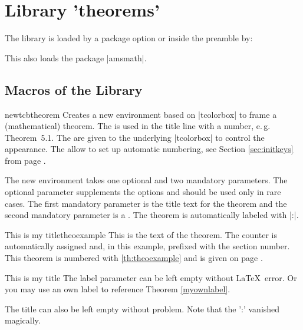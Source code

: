\clearpage
\section{Library 'theorems'}\label{sec:theorems}
The library is loaded by a package option or inside the preamble by:
\begin{dispListing}
\end{dispListing}
This also loads the package |amsmath|.

\subsection{Macros of the Library}


\begin{docCommand}{newtcbtheorem}{}
  Creates a new environment  based on |tcolorbox| to frame a
  (mathematical) theorem. The  is used in the title line
  with a number, e.\,g. \mbox{\flqq Theorem 5.1\frqq}.
  The  are given to the underlying |tcolorbox| to control
  the appearance.
  The  allow to set up automatic numbering,
  see Section \ref{sec:initkeys} from page \pageref{sec:initkeys}.\par
  The new environment  takes one optional and two mandatory
  parameters. The optional parameter supplements the options and should be
  used only in rare cases.
  The first mandatory parameter is the title text for the theorem and
  the second mandatory parameter is a . The theorem is
  automatically labeled with |:|.

\enlargethispage*{20mm}
\begin{dispExample}
\begin{mytheo}{This is my title}{theoexample}
  This is the text of the theorem. The counter is automatically assigned and,
  in this example, prefixed with the section number. This theorem is numbered with
  \ref{th:theoexample} and is given on page \pageref{th:theoexample}.
\end{mytheo}
\end{dispExample}

\begin{dispExample}
\begin{mytheo}[label=myownlabel]{This is my title}{}
  The label parameter can be left empty without \LaTeX\ error.
  Or you may use an own label to reference Theorem \ref{myownlabel}.
\end{mytheo}
\end{dispExample}

\begin{dispExample}
\begin{mytheo}{}{}
  The title can also be left empty without problem. Note that the ':'
  vanished magically.
\end{mytheo}
\end{dispExample}
\end{docCommand}


